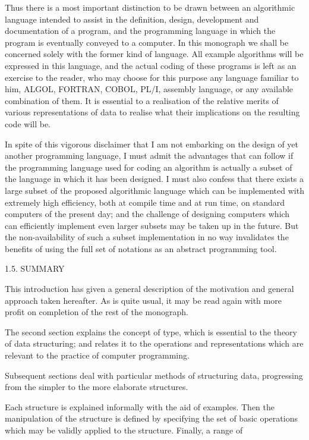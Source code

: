 Thus there is a most important distinction to be drawn between an algorithmic language intended to assist in the definition, design, development and documentation of a program, and the programming language in which the program is eventually conveyed to a computer. In this monograph we shall be concerned solely with the former kind of language. All example algorithms will be expressed in this language, and the actual coding of these programs is left as an exercise to the reader, who may choose for this purpose any language familiar to him, ALGOL, FORTRAN, COBOL, PL/I, assembly language, or any available combination of them. It is essential to a realisation of the relative merits of various representations of data to realise what their implications on the resulting code will be.

In spite of this vigorous disclaimer that I am not embarking on the design of yet another programming language, I must admit the advantages that can follow if the programming language used for coding an algorithm is actually a subset of the language in which it has been designed. I must also confess that there exists a large subset of the proposed algorithmic language which can be implemented with extremely high efficiency, both at compile time and at run time, on standard computers of the present day; and the challenge of designing computers which can efficiently implement even larger subsets may be taken up in the future. But the non-availability of such a subset implementation in no way invalidates the benefits of using the full set of notations as an abstract programming tool.

1.5. SUMMARY

This introduction has given a general description of the motivation and general approach taken hereafter. As is quite usual, it may be read again with more profit on completion of the rest of the monograph.

The second section explains the concept of type, which is essential to the theory of data structuring; and relates it to the operations and representations which are relevant to the practice of computer programming.

Subsequent sections deal with particular methods of structuring data, progressing from the simpler to the more elaborate structures.

Each structure is explained informally with the aid of examples. Then the manipulation of the structure is defined by specifying the set of basic operations which may be validly applied to the structure. Finally, a range of

